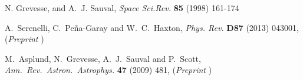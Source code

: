 \documentclass[11pt,a4paper]{article}
\begin{document}
\begin{thebibliography}{10}
N. Grevesse, and A.~J. Sauval, {\em Space Sci.Rev.} {\bf 85} (1998) 161-174
  
  A.~Serenelli, C.~Pe\~{n}a-Garay and W.~C.~Haxton, {\em Phys. Rev.} {\bf D87} (2013) 043001, (\textit{Preprint} )

  M.~Asplund, N.~Grevesse, A.~J.~Sauval and P.~Scott, {\em Ann.\ Rev.\ Astron.\ Astrophys.} {\bf 47} (2009) 481, (\textit{Preprint} )
  
\end{thebibliography}

%
\end{document}
